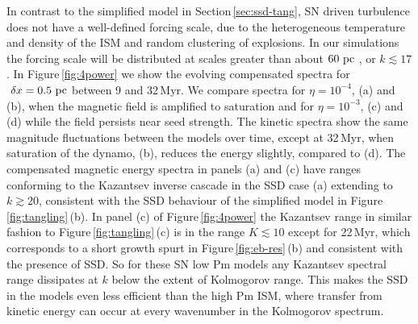\documentclass[preprint2]{aastex63}
\newcommand\pc{~ {\rm pc}}
\newcommand\dx{~ {\delta x}}
\begin{document}
In contrast to the simplified model in Section\,\ref{sec:ssd-tang}, SN driven
turbulence does not have a well-defined forcing scale, due to the heterogeneous
temperature and density of the ISM and random clustering of explosions.
In our simulations the forcing scale will be distributed at scales 
greater than about $60\pc$ \citep[][Table\,3]{HSSFG17}, or $k\lesssim17$.
In Figure\,\ref{fig:4power} we show the evolving compensated spectra for
$\dx=0.5\pc$ between 9 and 32\,Myr.
We compare spectra for $\eta=10^{-4}$, (a) and (b), when the magnetic field is 
amplified to saturation and for $\eta=10^{-3}$, (c) and (d) while the field
persists near seed strength.
The kinetic spectra show the same magnitude fluctuations between the models
over time,
except at 32\,Myr, when saturation of the dynamo, (b), reduces
the energy slightly, compared to (d). 
The compensated magnetic energy spectra in panels (a) and (c) have ranges 
conforming to the Kazantsev inverse cascade in the SSD case (a) extending to
$k\gtrsim 20$, consistent with the SSD behaviour of the simplified model in
Figure\,\ref{fig:tangling}\,(b).
In panel (c) of Figure\,\ref{fig:4power} the Kazantsev range in similar fashion
to Figure\,\ref{fig:tangling}\,(c) is in the range 
$K\lesssim10$ except
for 22\,Myr, which corresponds to a short growth spurt in
Figure\,\ref{fig:eb-res}\,(b) and consistent with the presence of SSD.
So for these SN low Pm models any Kazantsev spectral range dissipates 
at $k$ below the extent of Kolmogorov range.
This makes the SSD in the models even less efficient 
than the high Pm ISM,
where transfer from kinetic energy can occur at every wavenumber in the
Kolmogorov spectrum.
\end{document}
